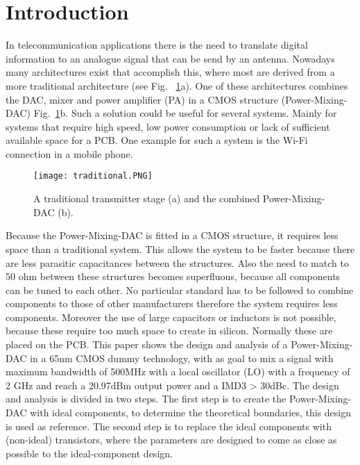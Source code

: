 \section{Introduction} \label{sec:introduction}
In telecommunication applications there is the need to translate digital information to an analogue signal that can be send by an antenna. Nowadays many architectures exist that accomplish this, where most are derived from a more traditional architecture (see Fig. ~\ref{fig:traditional}a). One of these architectures combines the DAC, mixer and power amplifier (PA) in a CMOS structure (Power-Mixing-DAC) Fig.~\ref{fig:traditional}b. Such a solution could be useful for several systems. Mainly for systems that require high speed, low power consumption or lack of sufficient available space for a PCB. One example for such a system is the Wi-Fi connection in a mobile phone.
\begin{figure}[h]
\texttt{[image: traditional.PNG]}
\caption{A traditional transmitter stage (a) and the combined Power-Mixing-DAC (b). ~\cite{powerdac}}
\label{fig:traditional}
\end{figure} 
Because the Power-Mixing-DAC is fitted in a CMOS structure, it requires less space than a traditional system. This allows the system to be faster because there are less parasitic capacitances between the structures. Also the need to match to 50 ohm between these structures becomes superfluous, because all components can be tuned to each other. No particular standard has to be followed to combine components to those of other manufacturers therefore the system requires less components. Moreover the use of large capacitors or inductors is not possible, because these require too much space to create in silicon. Normally these are placed on the PCB.
This paper shows the design and analysis of a Power-Mixing-DAC in a 65nm CMOS dummy technology, with as goal to mix a signal with maximum bandwidth of 500MHz with a local oscillator (LO) with a frequency of 2 GHz and reach a 20.97dBm output power and a IMD3 > 30dBc. The design and analysis is divided in two steps. The first step is to create the Power-Mixing-DAC with ideal components, to determine the theoretical boundaries, this design is used as reference. The second step is to replace the ideal components with (non-ideal) transistors, where the parameters are designed to come as close as possible to the ideal-component design.
